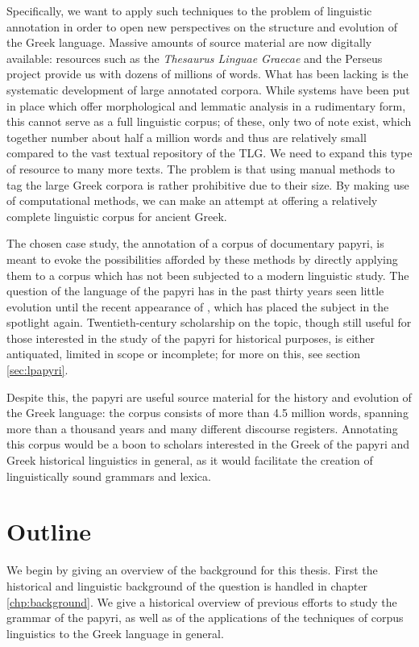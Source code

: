 Specifically, we want to apply such techniques to the problem of
linguistic annotation in order to open new perspectives on the
structure and evolution of the Greek language. Massive amounts of
source material are now digitally available: resources such as the
\textit{Thesaurus Linguae Graecae} and the Perseus project provide us
with dozens of millions of words. What has been lacking is the
systematic development of large annotated corpora. While systems have
been put in place which offer morphological and lemmatic analysis in a
rudimentary form, this cannot serve as a full linguistic corpus; of
these, only two of note exist, which together number about half a
million words and thus are relatively small compared to the vast
textual repository of the TLG. We need to expand this type of resource
to many more texts. The problem is that using manual methods to tag
the large Greek corpora is rather prohibitive due to their size. By
making use of computational methods, we can make an attempt at
offering a relatively complete linguistic corpus for ancient Greek.

The chosen case study, the annotation of a corpus of documentary
papyri, is meant to evoke the possibilities afforded by these methods
by directly applying them to a corpus which has not been subjected to
a modern linguistic study. The question of the language of the papyri
has in the past thirty years seen little evolution until the recent
appearance of \cite{lpapyri}, which has placed the subject in the
spotlight again. Twentieth-century scholarship on the topic, though
still useful for those interested in the study of the papyri for
historical purposes, is either antiquated, limited in scope or
incomplete; for more on this, see section \vref{sec:lpapyri}. 

Despite this, the papyri are useful source material for the history
and evolution of the Greek language: the corpus consists of more than
4.5 million words, spanning more than a thousand years and many
different discourse registers. Annotating this corpus would be a boon
to scholars interested in the Greek of the papyri and Greek historical
linguistics in general, as it would facilitate the creation of
linguistically sound grammars and lexica.

\section{Outline}
We begin by giving an overview of the background for this thesis.
First the historical and linguistic background of the question is
handled in chapter \vref{chp:background}. We give a historical overview of
previous efforts to study the grammar of the papyri, as well as of the
applications of the techniques of corpus linguistics to the Greek
language in general.

